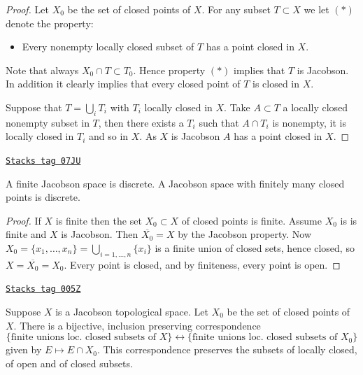 \begin{proof}
Let $X_0$ be the set of closed points of $X$. For any subset
$T \subset X$ we let $(*)$ denote the property:
\begin{itemize}
\item[(*)] Every nonempty locally closed subset of $T$ has a point
closed in $X$.
\end{itemize}
Note that always $X_0 \cap T \subset T_0$. Hence property $(*)$
implies that $T$ is Jacobson. In addition it clearly implies
that every closed point of $T$ is closed in $X$.

\medskip\noindent
Suppose that $T=\bigcup_i T_i$ with $T_i$ locally closed in $X$.
Take $A\subset T$ a locally closed nonempty subset in $T$,
then there exists a $T_i$ such that $A\cap T_i$ is nonempty, it is
locally closed in $T_i$ and so in $X$.
As $X$ is Jacobson $A$ has a point closed in $X$.
\end{proof}

\begin{lemma}
\label{topology-lemma-finite-jacobson}
\href{https://stacks.math.columbia.edu/tag/07JU}{\texttt{Stacks tag 07JU}}

A finite Jacobson space is discrete.
A Jacobson space with finitely many closed points is discrete.
\end{lemma}

\begin{proof}
If $X$ is finite then the set $X_0 \subset X$ of closed points is finite.
Assume $X_0$ is is finite and $X$ is Jacobson.
Then $\overline{X_0} = X$ by the Jacobson property.
Now $X_0 =\{x_1, \ldots, x_n\} = \bigcup_{i = 1, \ldots, n} \{x_i\}$
is a finite union of closed sets, hence closed, so
$X = \overline{X_0} = X_0$. Every point is closed, and by
finiteness, every point is open.
\end{proof}

\begin{lemma}
\label{topology-lemma-jacobson-equivalent-locally-closed}
\href{https://stacks.math.columbia.edu/tag/005Z}{\texttt{Stacks tag 005Z}}


Suppose $X$ is a Jacobson topological space.
Let $X_0$ be the set of closed points of $X$.
There is a bijective, inclusion preserving correspondence
$$
\{\text{finite unions loc. closed subsets of } X\}
\leftrightarrow
\{\text{finite unions loc. closed subsets of } X_0\}
$$
given by $E \mapsto E \cap X_0$. This correspondence preserves
the subsets of locally closed, of open and of closed subsets.
\end{lemma}

